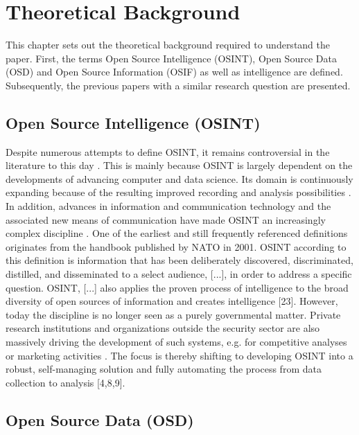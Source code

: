 \documentclass[10pt]{article}
\begin{document}
\section{Theoretical Background}

This chapter sets out the theoretical background required to understand the paper. First, the terms Open Source Intelligence (OSINT), Open Source Data (OSD) and Open Source Information (OSIF) as well as intelligence are defined. Subsequently, the previous papers with a similar research question are presented.

\subsection{Open Source Intelligence (OSINT)}

Despite numerous attempts to define OSINT, it remains controversial in the literature to this day \cite{Williams.2018}. This is mainly because OSINT is largely dependent on the developments of advancing computer and data science. Its domain is continuously expanding because of the resulting improved recording and analysis possibilities \cite{AlKilani.2021,Ghioni.2023,Williams.2018}. In addition, advances in information and communication technology and the associated new means of communication have made OSINT an increasingly complex discipline \cite{AlKilani.2021, Benes.2013, Chen.2012, Williams.2018}. One of the earliest and still frequently referenced definitions \cite{DosPassos.2017} originates from the handbook published by NATO in 2001. OSINT according to this definition is information that has been deliberately discovered, discriminated, distilled, and disseminated to a select audience, [...], in order to address a specific question. OSINT, [...] also applies the proven process of intelligence to the broad diversity of open sources of information and creates intelligence [23]. However, today the discipline is no longer seen as a purely governmental matter. Private research institutions and organizations outside the security sector \cite{Bohm.2021,Mercado.2005} are also massively driving the development of such systems, e.g. for competitive analyses or marketing activities \cite{AlKilani.2021,Dokman.2020,Ghioni.2023}. The focus is thereby shifting to developing OSINT into a robust, self-managing solution and fully automating the process from data collection to analysis [4,8,9].

\subsection{Open Source Data (OSD)}
\end{document}
